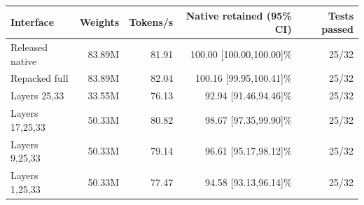 \begin{tabular}{lrrrr}
\toprule
Interface & Weights & Tokens/s & Native retained (95\% CI) & Tests passed \\
\midrule
Released native & 83.89M & 81.91 & 100.00 [100.00,100.00]\% & 25/32 \\
Repacked full & 83.89M & 82.04 & 100.16 [99.95,100.41]\% & 25/32 \\
Layers 25,33 & 33.55M & 76.13 & 92.94 [91.46,94.46]\% & 25/32 \\
Layers 17,25,33 & 50.33M & 80.82 & 98.67 [97.35,99.90]\% & 25/32 \\
Layers 9,25,33 & 50.33M & 79.14 & 96.61 [95.17,98.12]\% & 25/32 \\
Layers 1,25,33 & 50.33M & 77.47 & 94.58 [93.13,96.14]\% & 25/32 \\
\bottomrule
\end{tabular}
